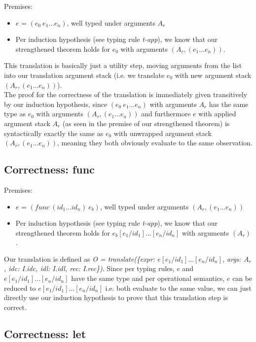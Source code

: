 \documentclass[letterpaper,12pt]{article}
\begin{document}
Premises:
\begin{itemize}
	\item $e$ = $(e_0\: e_1 \dots e_n)$, well typed under arguments $A_r$
	\item Per induction hypothesis (see typing rule \textit{t-app}), we
		know that our strengthened theorem holds for $e_0$ with arguments
		$(A_r, (e_1 \dots e_n))$.
\end{itemize}

This translation is basically just a utility step, moving arguments
from the list into our translation argument stack (i.e. we translate
$e_0$ with new argument stack $(A_r, (e_1 \dots e_n))$). \\
The proof for the correctness of the translation is immediately given transitively
by our induction hypothesis, since $(e_0\: e_1 \dots e_n)$ with arguments 
$A_r$ has the same type as $e_0$ with arguments $(A_r, (e_1 \dots e_n))$
and furthermore $e$ with applied argument stack $A_r$ (as seen in the
premise of our strengthened theorem) is syntactically
exactly the same as $e_0$ with unwrapped argument stack $(A_r, (e_1 \dots e_n))$,
meaning they both obviously evaluate to the same observation.

\subsection{Correctness: func}

Premises:
\begin{itemize}
	\item $e$ = $(func\: (id_1 \dots id_n)\: e_b)$, well typed
		under arguments $(A_r, (e_1 \dots e_n))$
	\item Per induction hypothesis (see typing rule \textit{t-app}), we
		know that our strengthened theorem holds for $e_b[e_1 / id_1]\dots[e_n / id_n]$ with arguments
		$(A_r)$.
\end{itemize}

Our translation is defined as 
\textit{O = translate(\{expr: $e[e_1 / id_1]\dots[e_n / id_n]$, args: $A_r$,
idc: I.idc, idl: I.idl, rec: I.rec\})}. Since per typing rules,
$e$ and $e[e_1 / id_1]\dots[e_n / id_n]$ have the same type and
per operational semantics, $e$ can be reduced to
$e[e_1 / id_1]\dots[e_n / id_n]$ i.e. both evaluate to the same value,
we can just directly use our induction hypothesis to prove that
this translation step is correct.

\subsection{Correctness: let}
\end{document}
